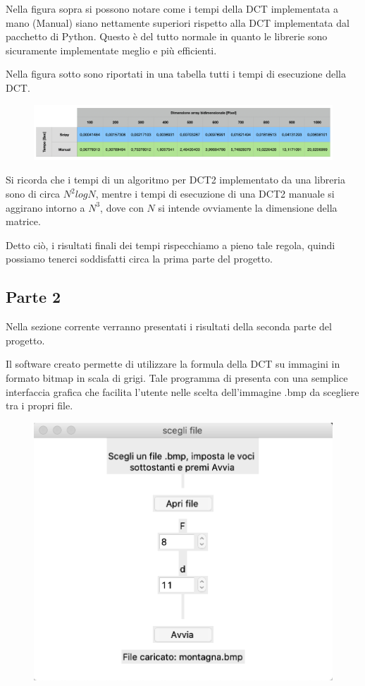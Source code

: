 \documentclass[preprint,12pt]{elsarticle}
\begin{document}
Nella figura sopra si possono notare come i tempi della DCT implementata a mano (Manual) siano nettamente superiori rispetto alla DCT implementata dal pacchetto di Python. Questo è del tutto normale in quanto le librerie sono sicuramente implementate meglio e più efficienti.

\newpage
Nella figura sotto sono riportati in una tabella tutti i tempi di esecuzione della DCT.

\begin{figure}[H]
	\centering
	\includegraphics[width=\linewidth]{tabella}
\end{figure}

Si ricorda che i tempi di un algoritmo per DCT2 implementato da una libreria sono di circa $N^2 logN$, mentre i tempi di esecuzione di una DCT2 manuale si aggirano intorno a $N^3$, dove con $N$ si intende ovviamente la dimensione della matrice.

Detto ciò, i risultati finali dei tempi rispecchiamo a pieno tale regola, quindi possiamo tenerci soddisfatti circa la prima parte del progetto. 
\subsection{Parte 2}
Nella sezione corrente verranno presentati i risultati della seconda parte del progetto.

Il software creato permette di utilizzare la formula della DCT su immagini in formato bitmap in scala di grigi.
Tale programma di presenta con una semplice interfaccia grafica che facilita l'utente nelle scelta dell'immagine .bmp da scegliere tra i propri file.

\begin{figure}[H]
	\centering
	\includegraphics[width=0.5\linewidth]{gui}
\end{figure}
\end{document}
